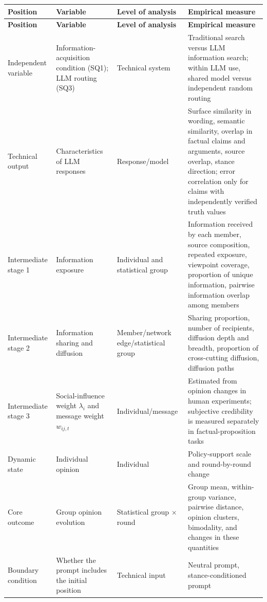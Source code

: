 \documentclass[11pt,a4paper]{article}
\renewcommand{\arraystretch}{1.2}
\begin{document}
\begin{center}
\small
\renewcommand{\arraystretch}{1.18}
\begin{longtable}{@{}p{}p{}p{}p{}@{}}
\toprule
\textbf{Position} & \textbf{Variable} & \textbf{Level of analysis} & \textbf{Empirical measure} \\
\midrule
\endfirsthead
\toprule
\textbf{Position} & \textbf{Variable} & \textbf{Level of analysis} & \textbf{Empirical measure} \\
\midrule
\endhead
Independent variable & Information-acquisition condition (SQ1); LLM routing (SQ3) & Technical system & Traditional search versus LLM information search; within LLM use, shared model versus independent random routing \\
Technical output & Characteristics of LLM responses & Response/model & Surface similarity in wording, semantic similarity, overlap in factual claims and arguments, source overlap, stance direction; error correlation only for claims with independently verified truth values \\
Intermediate stage 1 & Information exposure & Individual and statistical group & Information received by each member, source composition, repeated exposure, viewpoint coverage, proportion of unique information, pairwise information overlap among members \\
Intermediate stage 2 & Information sharing and diffusion & Member/network edge/statistical group & Sharing proportion, number of recipients, diffusion depth and breadth, proportion of cross-cutting diffusion, diffusion paths \\
Intermediate stage 3 & Social-influence weight $\lambda_i$ and message weight $w_{ij,t}$ & Individual/message & Estimated from opinion changes in human experiments; subjective credibility is measured separately in factual-proposition tasks \\
Dynamic state & Individual opinion & Individual & Policy-support scale and round-by-round change \\
Core outcome & Group opinion evolution & Statistical group $\times$ round & Group mean, within-group variance, pairwise distance, opinion clusters, bimodality, and changes in these quantities \\
Boundary condition & Whether the prompt includes the initial position & Technical input & Neutral prompt, stance-conditioned prompt \\
\bottomrule
\end{longtable}
\end{center}
\end{document}
